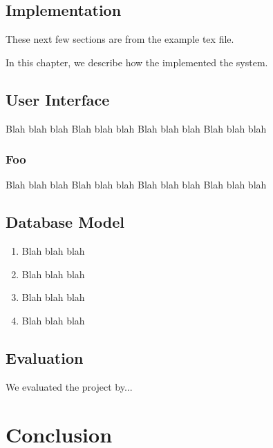 \documentclass{l3proj}
\begin{document}
\section{Implementation}
\label{impl}

These next few sections are from the example tex file.

In this chapter, we describe how the implemented the system.

\section{User Interface}

Blah blah blah
Blah blah blah
Blah blah blah
Blah blah blah

\subsection{Foo}

Blah blah blah
Blah blah blah
Blah blah blah
Blah blah blah

\section{Database Model}

\begin{enumerate}
\item Blah blah blah
\item Blah blah blah
\item Blah blah blah
\item Blah blah blah
\end{enumerate}



\section{Evaluation}

We evaluated the project by...

\chapter{Conclusion}
\end{document}
